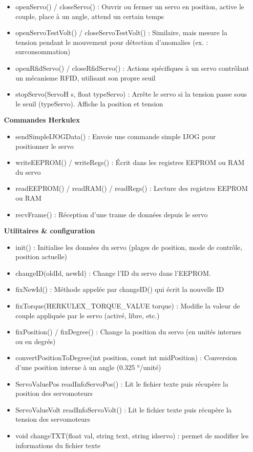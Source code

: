 \documentclass[main.tex]{subfiles}
\begin{document}
\begin{itemize}
\item openServo() / closeServo() : Ouvrir ou fermer un servo en position, active le couple, place à un angle, attend un certain temps
\item openServoTestVolt() / closeServoTestVolt() : Similaire, mais mesure la tension pendant le mouvement pour détection d’anomalies (ex. : surconsommation)
\item openRfidServo() / closeRfidServo() : Actions spécifiques à un servo contrôlant un mécanisme RFID, utilisant son propre seuil
\item stopServo(ServoH s, float typeServo) : Arrête le servo si la tension passe sous le seuil (typeServo). Affiche la position et tension
\end{itemize}
 
\textbf{Commandes Herkulex}

\begin{itemize}
\item sendSimpleIJOGData() : Envoie une commande simple IJOG pour positionner le servo
\item writeEEPROM() / writeRegs() : Écrit dans les registres EEPROM ou RAM du servo
\item readEEPROM() / readRAM() / readRegs() : Lecture des registres EEPROM ou RAM
\item recvFrame() : Réception d’une trame de données depuis le servo
\end{itemize}

\textbf{Utilitaires \& configuration}

\begin{itemize}
\item init() : Initialise les données du servo (plages de position, mode de contrôle, position actuelle)
\item changeID(oldId, newId) : Change l’ID du servo dans l’EEPROM.
\item fixNewId() : Méthode appelée par changeID() qui écrit la nouvelle ID
\item fixTorque(HERKULEX\_TORQUE\_VALUE torque) : Modifie la valeur de couple appliquée par le servo (activé, libre, etc.)
\item fixPosition() / fixDegree() : Change la position du servo (en unités internes ou en degrés)
\item convertPositionToDegree(int position, const int midPosition) : Conversion d'une position interne à un angle (0.325 °/unité)
\item ServoValuePos readInfoServoPos() : Lit le fichier texte puis récupère la position des servomoteurs
\item ServoValueVolt readInfoServoVolt() : Lit le fichier texte puis récupère la tension des servomoteurs
\item void changeTXT(float val, string text, string idservo) : permet de modifier les informations du fichier texte
\end{itemize}
\end{document}
